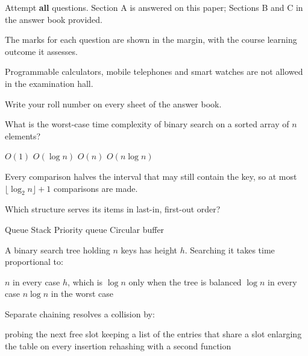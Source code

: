 \documentclass[type=final]{saus-exam}
\begin{document}
\makeexamhead

\begin{instructions}
  \item Attempt \textbf{all} questions. Section A is answered on this paper;
        Sections B and C in the answer book provided.
  \item The marks for each question are shown in the margin, with the course
        learning outcome it assesses.
  \item Programmable calculators, mobile telephones and smart watches are not
        allowed in the examination hall.
  \item Write your roll number on every sheet of the answer book.
\end{instructions}

\sausmarksgrid


\question[marks=2, clo=1, bloom=Remember, topic=Complexity]
What is the worst-case time complexity of binary search on a sorted array
of $n$ elements?
\begin{choices}[cols=4]
  \choice $O(1)$
  \correctchoice $O(\log n)$
  \choice $O(n)$
  \choice $O(n\log n)$
\end{choices}
\begin{solution}
  Every comparison halves the interval that may still contain the key, so at
  most $\lfloor\log_2 n\rfloor+1$ comparisons are made.
\end{solution}

\question[marks=2, clo=1, bloom=Understand, topic=Stacks and queues]
Which structure serves its items in last-in, first-out order?
\begin{choices}
  \choice Queue
  \correctchoice Stack
  \choice Priority queue
  \choice Circular buffer
\end{choices}

\question[marks=2, clo=1, bloom=Understand, topic=Trees]
A binary search tree holding $n$ keys has height $h$. Searching it takes
time proportional to:
\begin{choices}
  \choice $n$ in every case
  \correctchoice $h$, which is $\log n$ only when the tree is balanced
  \choice $\log n$ in every case
  \choice $n\log n$ in the worst case
\end{choices}

\question[marks=2, clo=2, bloom=Apply, topic=Hashing]
Separate chaining resolves a collision by:
\begin{choices}
  \choice probing the next free slot
  \correctchoice keeping a list of the entries that share a slot
  \choice enlarging the table on every insertion
  \choice rehashing with a second function
\end{choices}
\end{document}
